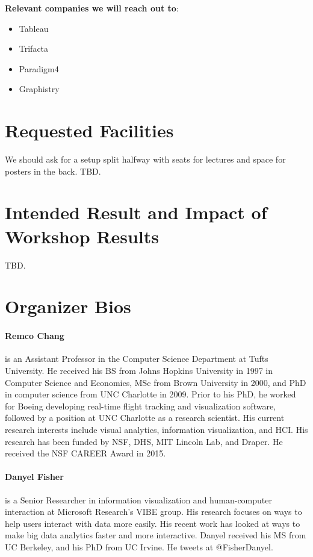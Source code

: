 \documentclass[journal]{vgtc}                %
\begin{document}
\noindent \textbf{Relevant companies we will reach out to}:
\begin{itemize}
\setlength\itemsep{0em}
\item Tableau
\item Trifacta
\item Paradigm4
\item Graphistry
\end{itemize}

\section{Requested Facilities}

We should ask for a setup split halfway with seats for lectures and space for posters in the back. TBD.

\section{Intended Result and Impact of Workshop Results}

TBD.


\section{Organizer Bios}

\paragraph*{Remco Chang} is an Assistant Professor in the Computer Science Department at Tufts University. He received his BS from Johns Hopkins University in 1997 in Computer Science and Economics, MSc from Brown University in 2000, and PhD in computer science from UNC Charlotte in 2009. Prior to his PhD, he worked for Boeing developing real-time flight tracking and visualization software, followed by a position at UNC Charlotte as a research scientist. His current research interests include visual analytics, information visualization, and HCI. His research has been funded by NSF, DHS, MIT Lincoln Lab, and Draper. He received the NSF CAREER Award in 2015.

\paragraph*{Danyel Fisher} is a Senior Researcher in information visualization and human-computer interaction at Microsoft Research's VIBE group. His research focuses on ways to help users interact with data more easily. His recent work has looked at ways to make big data analytics faster and more interactive. Danyel received his MS from UC Berkeley, and his PhD from UC Irvine. He tweets at @FisherDanyel.
\end{document}
